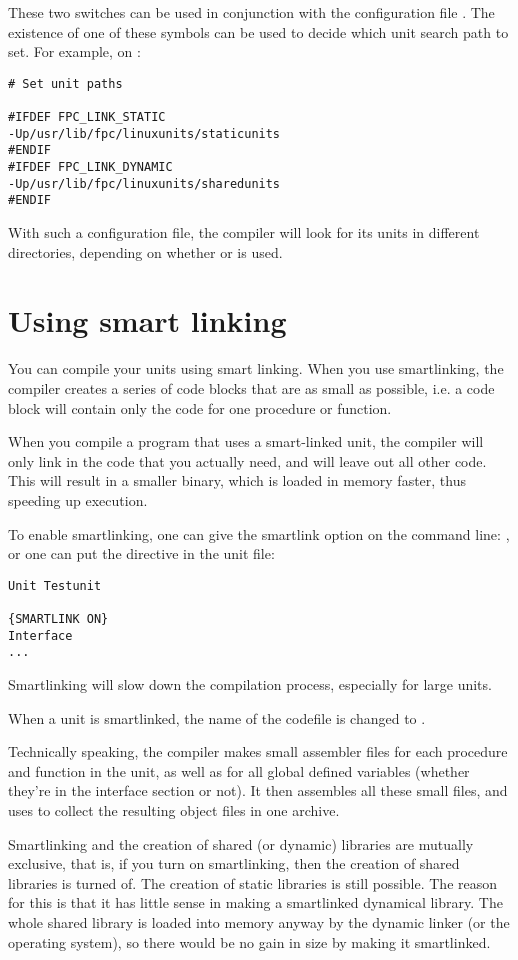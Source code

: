 These two switches can be used in conjunction with the configuration file
. The existence of one of these symbols can be used to
decide which unit search path to set. For example, on \linux:
\begin{verbatim}
# Set unit paths

#IFDEF FPC_LINK_STATIC
-Up/usr/lib/fpc/linuxunits/staticunits
#ENDIF
#IFDEF FPC_LINK_DYNAMIC
-Up/usr/lib/fpc/linuxunits/sharedunits
#ENDIF
\end{verbatim}
With such a configuration file, the compiler will look for its units in
different directories, depending on whether  or  is used.

\section{Using smart linking}
\label{se:SmartLinking}

You can compile your units using smart linking. When you use smartlinking,
the compiler creates a series of code blocks that are as small as possible,
i.e. a code block will contain only the code for one procedure or function.

When you compile a program that uses a smart-linked unit, the compiler will
only link in the code that you actually need, and will leave out all other
code. This will result in a smaller binary, which is loaded in memory
faster, thus speeding up execution.

To enable smartlinking, one can give the smartlink option on the command
line: , or one can put the  directive in
the unit file:
\begin{verbatim}
Unit Testunit

{SMARTLINK ON}
Interface
...
\end{verbatim}
Smartlinking will slow down the compilation process, especially for large
units.

When a unit  is smartlinked, the name of the codefile is
changed to .

Technically speaking, the compiler makes small assembler files for each
procedure and function in the unit, as well as for all global defined
variables (whether they're in the interface section or not). It then
assembles all these small files, and uses  to collect the resulting
object files in one archive.

Smartlinking and the creation of shared (or dynamic) libraries are mutually
exclusive, that is, if you turn on smartlinking, then the creation of shared
libraries is turned of. The creation of static libraries is still possible.
The reason for this is that it has little sense in making a smartlinked
dynamical library. The whole shared library is loaded into memory anyway by
the dynamic linker (or the operating system), so there would be no gain in size by
making it smartlinked.




